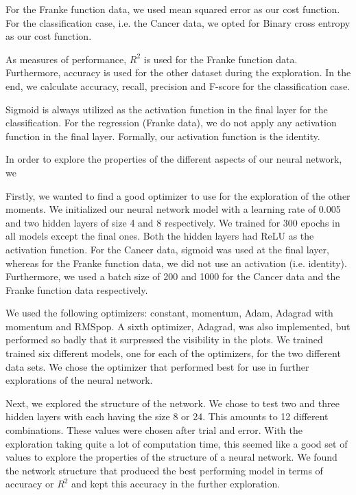 
For the Franke function data, we used mean squared error as our cost function. For the classification case, i.e. the Cancer data, we opted for Binary cross entropy as our cost function.

As measures of performance, $R^2$ is used for the Franke function data. 
Furthermore, accuracy is used for the other dataset during the exploration. 
In the end, we calculate accuracy, recall, precision and F-score for the classification case. 

Sigmoid is always utilized as the activation function in the final layer for the classification. 
For the regression (Franke data), we do not apply any activation function in the final layer.
Formally, our activation function is the identity.

In order to explore the properties of the different aspects of our neural network, we 

Firstly, we wanted to find a good optimizer to use for the exploration of the other moments. 
We initialized our neural network model with a learning rate of 0.005 and two hidden layers of size 4 and 8 respectively. We trained for 300 epochs in all models except the final ones. 
Both the hidden layers had ReLU as the activation function. 
For the Cancer data, sigmoid was used at the final layer, whereas for the Franke function data, we did not use an activation (i.e. identity). 
Furthermore, we used a batch size of 200 and 1000 for the Cancer data and the Franke function data respectively. 

We used the following optimizers: constant, momentum, Adam, Adagrad with momentum and RMSpop. 
A sixth optimizer, Adagrad, was also implemented, but performed so badly that it surpressed the visibility in the plots. 
We trained trained six different models, one for each of the optimizers, for the two different data sets. 
We chose the optimizer that performed best for use in further explorations of the neural network. 

Next, we explored the structure of the network. We chose to test two and three hidden layers with each having the size 8 or 24. 
This amounts to 12 different combinations. 
These values were chosen after trial and error.
With the exploration taking quite a lot of computation time, this seemed like a good set of values to explore the properties of the structure of a neural network. 
We found the network structure that produced the best performing model in terms of accuracy or $R^2$ and kept this accuracy in the further exploration. 

